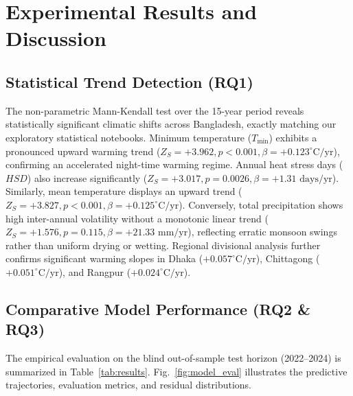 \documentclass[conference]{IEEEtran}
\begin{document}
\section{Experimental Results and Discussion}
\subsection{Statistical Trend Detection (RQ1)}
The non-parametric Mann-Kendall test over the 15-year period reveals statistically significant climatic shifts across Bangladesh, exactly matching our exploratory statistical notebooks. Minimum temperature ($T_{\min}$) exhibits a pronounced upward warming trend ($Z_S = +3.962, p < 0.001, \beta = +0.123^\circ\text{C/yr}$), confirming an accelerated night-time warming regime. Annual heat stress days ($HSD$) also increase significantly ($Z_S = +3.017, p = 0.0026, \beta = +1.31\text{ days/yr}$). Similarly, mean temperature displays an upward trend ($Z_S = +3.827, p < 0.001, \beta = +0.125^\circ\text{C/yr}$). Conversely, total precipitation shows high inter-annual volatility without a monotonic linear trend ($Z_S = +1.576, p = 0.115, \beta = +21.33\text{ mm/yr}$), reflecting erratic monsoon swings rather than uniform drying or wetting. Regional divisional analysis further confirms significant warming slopes in Dhaka ($+0.057^\circ\text{C/yr}$), Chittagong ($+0.051^\circ\text{C/yr}$), and Rangpur ($+0.024^\circ\text{C/yr}$).

\subsection{Comparative Model Performance (RQ2 \& RQ3)}
The empirical evaluation on the blind out-of-sample test horizon (2022--2024) is summarized in Table~\ref{tab:results}. Fig.~\ref{fig:model_eval} illustrates the predictive trajectories, evaluation metrics, and residual distributions.
\end{document}
